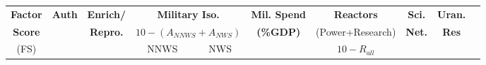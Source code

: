 \begin{table}
\centering
\begin{tabular}{|c|c|c|c|c|c|c|c|c|c|}
\hline
\textbf{Factor}      & \textbf{Auth}          & \textbf{Enrich/}      & \multicolumn{2}{c|}{\textbf{Military Iso.}}          & \textbf{Mil. Spend} &  \textbf{Reactors}  & \textbf{Sci.} & \textbf{Uran.} \\
\textbf{Score}  &                        &  \textbf{Repro.}   & \multicolumn{2}{c|}{$10 - (A_{NNWS}+A_{NWS})$}  & \textbf{(\%GDP)}    &   (Power+Research) & \textbf{Net.} &  \textbf{Res} \\
\cline{4-5}
 (FS)           &                         &                       &  NNWS                 & NWS               &                    & $10 - R_{all}$&               &              \\



\end{tabular}
\end{table}

